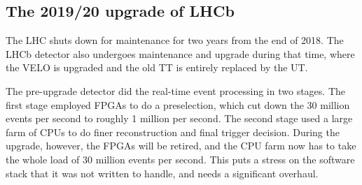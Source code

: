 \documentclass[12pt]{article}
\begin{document}
\newpage
\subsection{The 2019/20 upgrade of LHCb}\label{sec_lhcb_upgrade}

The LHC shuts down for maintenance for two years from the end of 2018. The LHCb detector also undergoes maintenance and upgrade during that time, where the VELO is upgraded and the old TT is entirely replaced by the UT.

The pre-upgrade detector did the real-time event processing in two stages. The first stage employed FPGAs to do a preselection, which cut down the 30 million events per second to roughly 1 million per second. The second stage used a large farm of CPUs to do finer reconstruction and final trigger decision. During the upgrade, however, the FPGAs will be retired, and the CPU farm now has to take the whole load of 30 million events per second. This puts a stress on the software stack that it was not written to handle, and needs a significant overhaul.
\end{document}
